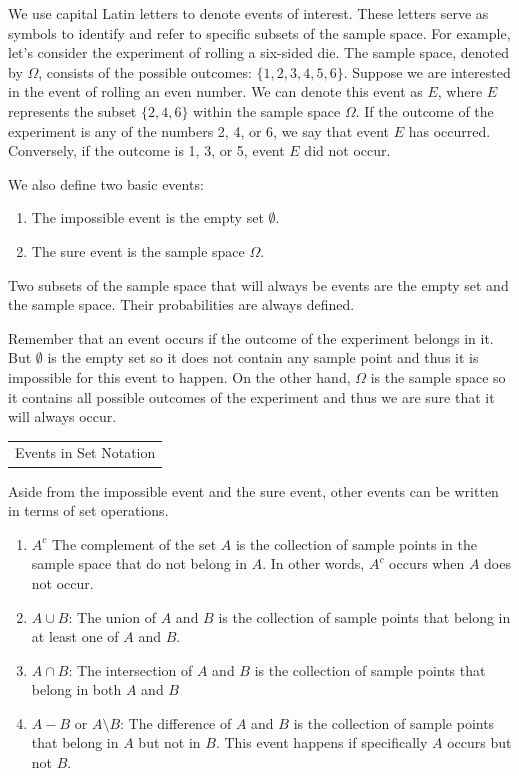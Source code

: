 \documentclass{article}
\begin{document}
We use capital Latin letters to denote events of interest. These letters serve as symbols to identify and refer to specific subsets of the sample space. For example, let's consider the experiment of rolling a six-sided die. The sample space, denoted by $\Omega$, consists of the possible outcomes: $\{1, 2, 3, 4, 5, 6\}$. Suppose we are interested in the event of rolling an even number. We can denote this event as $E$, where $E$ represents the subset $\{2, 4, 6\}$ within the sample space $\Omega$. If the outcome of the experiment is any of the numbers 2, 4, or 6, we say that event $E$ has occurred. Conversely, if the outcome is 1, 3, or 5, event $E$ did not occur.

We also define two basic events:

\begin{enumerate}
\item The impossible event is the empty set $\emptyset$.
\item The sure event is the sample space $\Omega$.
\end{enumerate}

Two subsets of the sample space that will always be events are the empty set and the sample space. Their probabilities are always defined.

Remember that an event occurs if the outcome of the experiment belongs in it. But $\emptyset$ is the empty set so it does not contain any sample point and thus it is impossible for this event to happen. On the other hand, $\Omega$ is the sample space so it contains all possible outcomes of the experiment and thus we are sure that it will always occur.

\begin{margintable}
\begin{tabular}{c} 
    Events in Set Notation
\end{tabular}
\end{margintable}

Aside from the impossible event and the sure event, other events can be written in terms of set operations.

\begin{enumerate}
\item $A^c$ The complement of the set $A$ is the collection of sample points in the sample space that do not belong in $A$. In other words, $A^c$ occurs when $A$ does not occur.
\item $A \cup B$: The union of $A$ and $B$ is the collection of sample points that belong in at least one of $A$ and $B$.
\item $A \cap B$: The intersection of $A$ and $B$ is the collection of sample points that belong in both $A$ and $B$
\item $A - B$ or $A \setminus B$: The difference of $A$ and $B$ is the collection of sample points that belong in $A$ but not in $B$. This event happens if specifically $A$ occurs but not $B$.
\end{enumerate}
\end{document}
